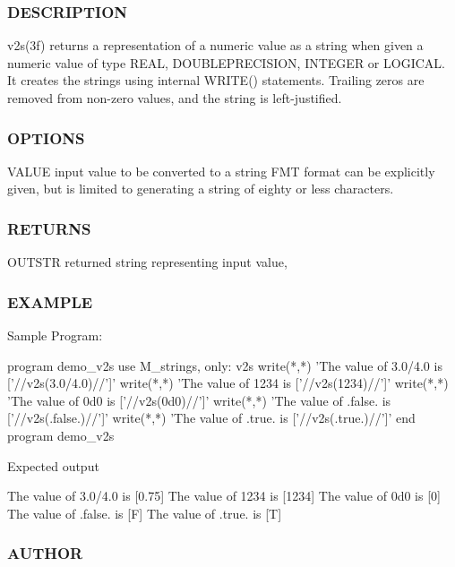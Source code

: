 \subsubsection*{D\+E\+S\+C\+R\+I\+P\+T\+I\+ON}

\begin{DoxyVerb}v2s(3f) returns a representation of a numeric value as a
string when given a numeric value of type REAL, DOUBLEPRECISION,
INTEGER or LOGICAL. It creates the strings using internal WRITE()
statements. Trailing zeros are removed from non-zero values, and the
string is left-justified.
\end{DoxyVerb}


\subsubsection*{O\+P\+T\+I\+O\+NS}

V\+A\+L\+UE input value to be converted to a string F\+MT format can be explicitly given, but is limited to generating a string of eighty or less characters.

\subsubsection*{R\+E\+T\+U\+R\+NS}

O\+U\+T\+S\+TR returned string representing input value,

\subsubsection*{E\+X\+A\+M\+P\+LE}

Sample Program\+: \begin{DoxyVerb}program demo_v2s
use M_strings, only: v2s
write(*,*) 'The value of 3.0/4.0 is ['//v2s(3.0/4.0)//']'
write(*,*) 'The value of 1234    is ['//v2s(1234)//']'
write(*,*) 'The value of 0d0     is ['//v2s(0d0)//']'
write(*,*) 'The value of .false. is ['//v2s(.false.)//']'
write(*,*) 'The value of .true. is  ['//v2s(.true.)//']'
end program demo_v2s
\end{DoxyVerb}


Expected output \begin{DoxyVerb} The value of 3.0/4.0 is [0.75]
 The value of 1234    is [1234]
 The value of 0d0     is [0]
 The value of .false. is [F]
 The value of .true. is  [T]
\end{DoxyVerb}


\subsubsection*{A\+U\+T\+H\+OR}

